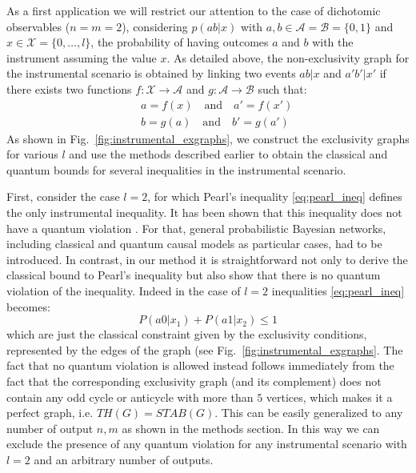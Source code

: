 \documentclass[letterpaper]{article}
\begin{document}
As a first application we will restrict our attention to the case of
dichotomic observables ($n = m = 2$), considering $p(ab|x)$ with $a, b \in
\mathcal{A} = \mathcal{B} = \{0,1\}$ and $x \in
\mathcal{X} = \{0,\ldots,l\}$, the probability of having outcomes $a$ and $b$
with the instrument assuming the value $x$. As detailed above, the
non-exclusivity graph for the instrumental scenario is obtained by linking two
events $ab|x$ and $a'b'|x'$ if there exists two functions $f:\mathcal{X}
\rightarrow \mathcal{A}$ and $g:\mathcal{A} \rightarrow
\mathcal{B}$ such that:
\begin{eqnarray}
   & &  a = f(x) \quad\text{and}\quad a'=f(x')\\ \nonumber
   & & b = g(a) \quad\text{and}\quad b'=g(a')
    \label{eq:non_exclusivity_condition}
\end{eqnarray}
As shown in Fig.~\ref{fig:instrumental_exgraphs}, we construct the exclusivity
graphs for various $l$ and use the methods described earlier to
obtain the classical and quantum bounds for several inequalities in the
instrumental scenario. 

First, consider the case $l=2$, for which Pearl's inequality
\eqref{eq:pearl_ineq} defines the only instrumental inequality. It has been
shown that this inequality does not have a quantum violation \cite{}.
For that, general probabilistic Bayesian networks, including classical and
quantum causal models as particular cases, had to be introduced.
In contrast, in our method it is straightforward not only to derive the
classical bound to Pearl's inequality but also show that there is no quantum
violation of the inequality. 
Indeed in the case of $l=2$ inequalities \eqref{eq:pearl_ineq} becomes:
\begin{equation}
    P(a0|x_1) + P(a1|x_2) \le 1 
    \label{eq:pearl_ineq_222}
\end{equation}
which are just the classical constraint given by the exclusivity conditions,
represented by the edges of the graph (see Fig.~\ref{fig:instrumental_exgraphs}.
The fact that no quantum violation is allowed instead 
follows immediately from the fact that the corresponding
exclusivity graph (and its complement) does not contain any odd cycle or
anticycle with more than $5$ vertices, which makes it a perfect graph, i.e.
$TH(G) = STAB(G)$.
This can be easily generalized to any number of output $n,m$ as shown in the
methods section. In this way we can exclude the presence of any quantum
violation for any instrumental scenario with $l=2$ and an arbitrary number of
outputs.
\end{document}
